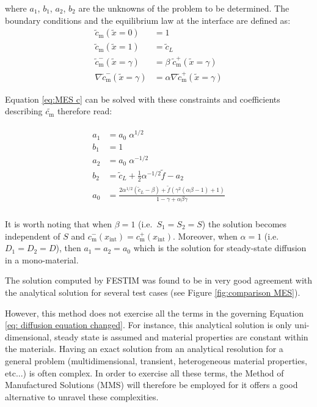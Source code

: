 where $a_1$, $b_1$, $a_2$, $b_2$ are the unknowns of the problem to be determined.
The boundary conditions and the equilibrium law at the interface are defined as:
\begin{subequations} \label{eq: bcs MES}
\begin{align} 
        \tilde{c}_\mathrm{m}(\tilde{x}=0) & = 1 \\
        \tilde{c}_\mathrm{m}(\tilde{x}=1) & =  \tilde{c}_L \\
        \tilde{c}_\mathrm{m}^-(\tilde{x}=\gamma) & =  \beta \; \tilde{c}_\mathrm{m}^+(\tilde{x}=\gamma)\\
        \nabla \tilde{c}_\mathrm{m}^-(\tilde{x}=\gamma) & =  \alpha \nabla \tilde{c}_\mathrm{m}^+(\tilde{x}=\gamma)
\end{align}
\end{subequations}


Equation \ref{eq:MES c} can be solved with these constraints and coefficients describing $\tilde{c_\mathrm{m}}$ therefore read:

\begin{align}
    \begin{split}
        a_1 &= a_0 \; \alpha^{1/2}  \\
        b_1 &= 1 \\
        a_2 &= a_0 \; \alpha^{-1/2}\\
        b_2 &= \tilde{c}_L + \frac{1}{2} \alpha^{-1/2} \tilde{f} - a_2 \\
        a_0 &= \frac{2 \alpha^{1/2}( \tilde{c}_L - \beta) + \tilde{f}  (\gamma^{2} \left(\alpha \beta - 1\right) + 1)}{1  - \gamma + \alpha \beta \gamma} \\
    \end{split}
    \label{eq: MES c coefficients}
\end{align}

It is worth noting that when $\beta=1$ (i.e.\ $S_1 = S_2 = S$) the solution becomes independent of $S$ and {$c_\mathrm{m}^{-}(x_\mathrm{int}) = c_\mathrm{m}^{+}(x_\mathrm{int})$}.
Moreover, when $\alpha = 1$ (i.e.\ $D_1 = D_2 = D$), then $a_1 = a_2 = a_0$ which is the solution for steady-state diffusion in a mono-material.

The solution computed by FESTIM was found to be in very good agreement with the analytical solution for several test cases (see Figure \ref{fig:comparison MES}).

 
However, this method does not exercise all the terms in the governing Equation \ref{eq: diffusion equation changed}.
For instance, this analytical solution is only uni-dimensional, steady state is assumed and material properties are constant within the materials.
Having an exact solution from an analytical resolution for a general problem (multidimensional, transient, heterogeneous material properties, etc...) is often complex.
In order to exercise all these terms, the Method of Manufactured Solutions (MMS) will therefore be employed for it offers a good alternative to unravel these complexities.


